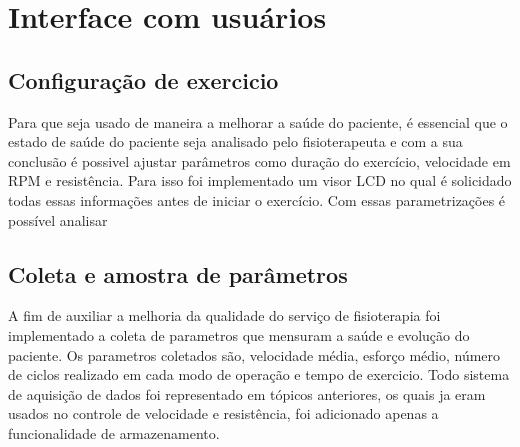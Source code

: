 \documentclass[../poliXuniversity_hospital_(USP)_report.tex]{subfiles}
\begin{document}
\section{Interface com usuários}

\subsection{Configuração de exercicio}
Para que seja usado de maneira a melhorar a saúde do paciente, é essencial que o estado de saúde do paciente seja analisado pelo fisioterapeuta e com a sua conclusão é possivel ajustar parâmetros como duração do exercício, velocidade em RPM e resistência. Para isso foi implementado um visor LCD no qual é solicidado todas essas informações antes de iniciar o exercício. Com essas parametrizações é possível analisar 

\subsection{Coleta e amostra de parâmetros}

A fim de auxiliar a melhoria da qualidade do serviço de fisioterapia foi implementado a coleta de parametros que mensuram a saúde e evolução do paciente. Os parametros coletados são, velocidade média, esforço médio, número de ciclos realizado em cada modo de operação e tempo de exercicio. Todo sistema de aquisição de dados foi representado em tópicos anteriores, os quais ja eram usados no controle de velocidade e resistência, foi adicionado apenas a funcionalidade de armazenamento.
\end{document}
